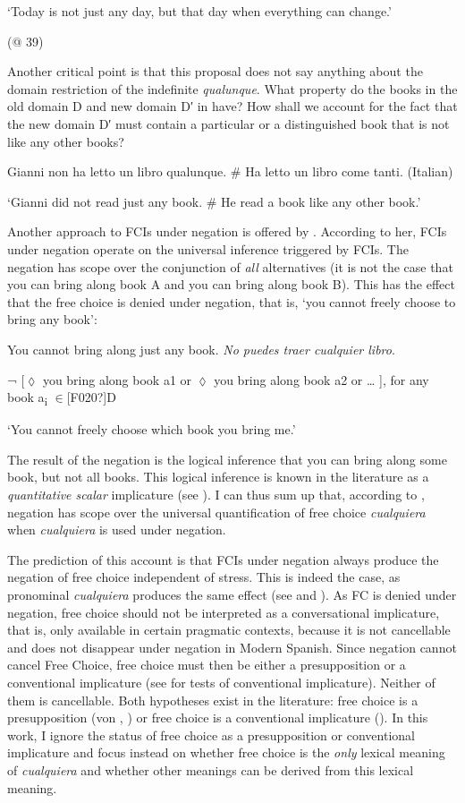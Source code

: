 \documentclass[output=paper]{langscibook}
\begin{document}
  ‘Today is not just any day, but that day when everything can change.’

  (@ 39)

Another critical point is that this proposal does not say anything about the domain restriction of the indefinite \textit{qualunque}. What property do the books in the old domain D and new domain D′ in  have? How shall we account for the fact that the new domain D′ must contain a particular or a distinguished book that is not like any other books?

  Gianni non ha letto un libro qualunque. \# Ha letto un libro come tanti.  (Italian)

  ‘Gianni did not read just any book. \# He read a book like any other book.’  

Another approach to FCIs under negation is offered by \citet{Aloni2007}. According to her, FCIs under negation operate on the universal inference triggered by FCIs. The negation has scope over the conjunction of \textit{all} alternatives (it is not the case that you can bring along book A and you can bring along book B). This has the effect that the free choice is denied under negation, that is, ‘you cannot freely choose to bring any book’:

\label{bkm:Ref43030327}  You cannot bring along just any book. \textit{No puedes traer cualquier libro}. 

  ¬ [${\lozenge}$ you bring along book a1 or ${\lozenge}$ you bring along book a2 or … ], for any book a\textsubscript{i} ${\in}$[F020?]D

  ‘You cannot freely choose which book you bring me.’

The result of the negation is the logical inference that you can bring along some book, but not all books. This logical inference is known in the literature as a \textit{quantitative scalar} implicature (see \citealt{Chierchia2006,Chierchia2013}). I can thus sum up that, according to \citet{Aloni2007}, negation has scope over the universal quantification of free choice \textit{cualquiera} when \textit{cualquiera} is used under negation. 

  The prediction of this account is that FCIs under negation always produce the negation of free choice independent of stress. This is indeed the case, as pronominal \textit{cualquiera} produces the same effect (see  and ). As FC is denied under negation, free choice should not be interpreted as a conversational implicature, that is, only available in certain pragmatic contexts, because it is not cancellable and does not disappear under negation in Modern Spanish. Since negation cannot cancel Free Choice, free choice must then be either a presupposition or a conventional implicature (see \citealt{Potts2005} for tests of conventional implicature). Neither of them is cancellable. Both hypotheses exist in the literature: free choice is a presupposition (von \citealt{Fintel2000}, \citealt{ChoiRomero2007}) or free choice is a conventional implicature (\citealt{Aloni2007,Aloni2021}). In this work, I ignore the status of free choice as a presupposition or conventional implicature and focus instead on whether free choice is the \textit{only} lexical meaning of \textit{cualquiera} and whether other meanings can be derived from this lexical meaning. 
\end{document}
